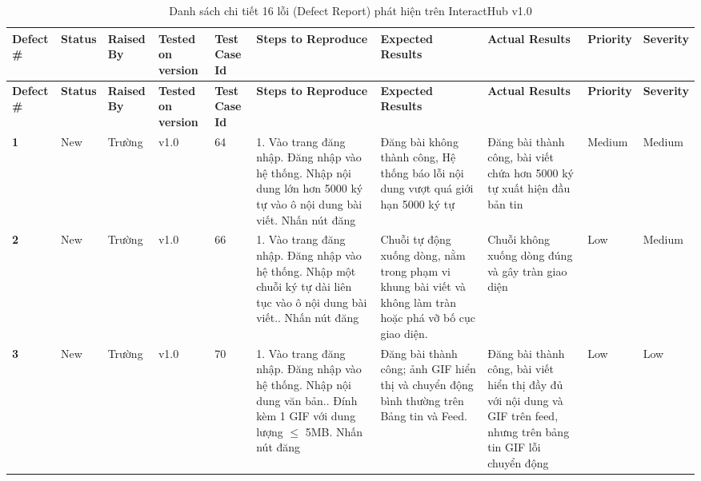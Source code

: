 \documentclass[11pt,a4paper]{article}
\begin{document}
\begingroup
\scriptsize
\setlength{\tabcolsep}{2pt}
\begin{longtable}{|C{0.9cm}|C{0.85cm}|C{0.95cm}|C{1.05cm}|C{0.85cm}|L{3.25cm}|L{2.7cm}|L{2.7cm}|C{1.0cm}|C{1.0cm}|}
\hline
{}
{\tiny\textbf{Defect \#}} & {\tiny\textbf{Status}} & {\tiny\textbf{Raised By}} & {\tiny\textbf{Tested on version}} & {\tiny\textbf{Test Case Id}} & {\tiny\textbf{Steps to Reproduce}} & {\tiny\textbf{Expected Results}} & {\tiny\textbf{Actual Results}} & {\tiny\textbf{Priority}} & {\tiny\textbf{Severity}} \tabularnewline
\hline
\endfirsthead
\hline
{}
{\tiny\textbf{Defect \#}} & {\tiny\textbf{Status}} & {\tiny\textbf{Raised By}} & {\tiny\textbf{Tested on version}} & {\tiny\textbf{Test Case Id}} & {\tiny\textbf{Steps to Reproduce}} & {\tiny\textbf{Expected Results}} & {\tiny\textbf{Actual Results}} & {\tiny\textbf{Priority}} & {\tiny\textbf{Severity}} \tabularnewline
\hline
\endhead
\hline
\endfoot
\hline
\caption{Danh sách chi tiết 16 lỗi (Defect Report) phát hiện trên InteractHub v1.0}
\endlastfoot
\textbf{1} & New & Trường & v1.0 & 64 & 1. Vào trang đăng nhập. Đăng nhập vào hệ thống. Nhập nội dung lớn hơn 5000 ký tự vào ô nội dung bài viết. Nhấn nút đăng & Đăng bài không thành công, Hệ thống báo lỗi nội dung vượt quá giới hạn 5000 ký tự & Đăng bài thành công, bài viết chứa hơn 5000 ký tự xuất hiện đầu bản tin & Medium & Medium \\ \hline
\textbf{2} & New & Trường & v1.0 & 66 & 1. Vào trang đăng nhập. Đăng nhập vào hệ thống. Nhập một chuỗi ký tự dài liên tục vào ô nội dung bài viết.. Nhấn nút đăng & Chuỗi tự động xuống dòng, nằm trong phạm vi khung bài viết và không làm tràn hoặc phá vỡ bố cục giao diện. & Chuỗi không xuống dòng đúng và gây tràn giao diện & Low & Medium \\ \hline
\textbf{3} & New & Trường & v1.0 & 70 & 1. Vào trang đăng nhập. Đăng nhập vào hệ thống. Nhập nội dung văn bản.. Đính kèm 1 GIF với dung lượng $\le$ 5MB. Nhấn nút đăng & Đăng bài thành công; ảnh GIF hiển thị và chuyển động bình thường trên Bảng tin và Feed. & Đăng bài thành công, bài viết hiển thị đầy đủ với nội dung và GIF trên feed, nhưng trên bảng tin GIF lỗi chuyển động & Low & Low \\ \hline

\end{longtable}
\end{document}
